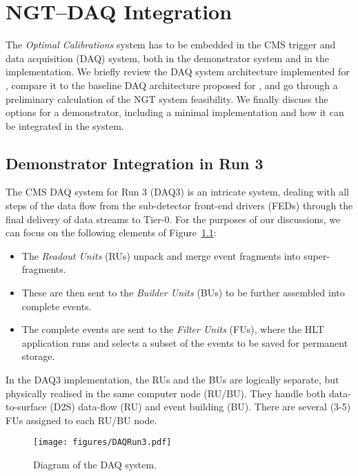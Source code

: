 \chapter{NGT--DAQ Integration} \label{sec:NGT-DAQintegration}

The \emph{Optimal Calibrations} system has to be embedded in the CMS trigger and data acquisition (DAQ) system,
both in the demonstrator system and in the \Phasetwo implementation. We briefly review the DAQ system architecture implemented for \Runthree, compare it to the baseline DAQ architecture proposed for \Phasetwo, and go through a preliminary calculation of the NGT system feasibility. We finally discuss the options for a demonstrator, including a minimal implementation and how it can be integrated in the \Runthree system.

\section{Demonstrator Integration in Run 3}
The CMS DAQ system for Run 3 (DAQ3) is an intricate system, dealing with all steps of the data flow from the sub-detector front-end drivers (FEDs) through the final delivery of data streams to Tier-0. For the purposes of our discussions, we can focus on the following elements of Figure~\ref{fig:DAQ3}: 
\begin{itemize}
    \item The \emph{Readout Units} (RUs) unpack and merge event fragments into super-fragments.
    \item These are then sent to the \emph{Builder Units} (BUs) to be further assembled into complete events.
    \item The complete events are sent to the \emph{Filter Units} (FUs), where the HLT application runs and selects a subset of the events to be saved for permanent storage. 
\end{itemize}

In the DAQ3 implementation, the RUs and the BUs are logically separate, but physically realised in the same computer node (RU/BU). They handle both data-to-surface (D2S) data-flow (RU) and event building (BU). There are several (3-5) FUs assigned to each RU/BU node.

\begin{figure}[htbp]
   \centering
	\texttt{[image: figures/DAQRun3.pdf]}
  \caption{Diagram of the \Runthree DAQ system.}
   \label{fig:DAQ3}
\end{figure}

